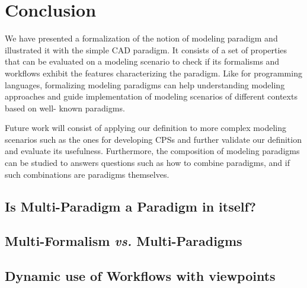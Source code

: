 \section{Conclusion}
\label{sec:Conclusion}
We have presented a formalization of the notion of modeling paradigm and illustrated it with the simple CAD paradigm. It consists of a set of properties that can be evaluated on a modeling scenario to check if its formalisms and workflows exhibit the features characterizing the paradigm. Like for programming languages, formalizing modeling paradigms can help understanding modeling approaches and guide implementation of modeling scenarios of different contexts based on well- known paradigms.

Future work will consist of applying our definition to more complex modeling scenarios such as the ones for developing CPSs and further validate our definition and evaluate its usefulness. Furthermore, the composition of modeling paradigms can be studied to answers questions such as how to combine paradigms, and if such combinations are paradigms themselves.



\subsection{Is Multi-Paradigm a Paradigm in itself?}
\label{sec:Discussion-Multiparadigm}

\subsection{Multi-Formalism \emph{vs.} Multi-Paradigms}
\label{sec:Discussion-MFvsMP}

\subsection{Dynamic use of Workflows with viewpoints}
\label{sec:Discussion-Dynamic}
